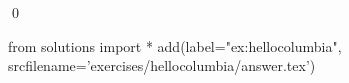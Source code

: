 
\begin{ex} 
  \label{ex:hellocolumbia}
  
  \qed
\end{ex} 
\begin{python0}
from solutions import *
add(label="ex:hellocolumbia",
    srcfilename='exercises/hellocolumbia/answer.tex') 
\end{python0}
